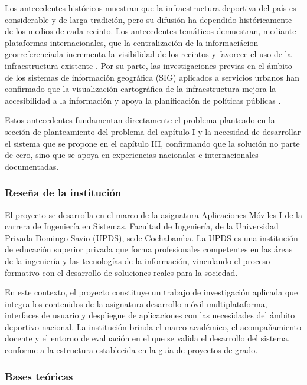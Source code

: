 Los antecedentes hist\'oricos muestran que la infraestructura deportiva del
pa\'is es considerable y de larga tradici\'on, pero su difusi\'on ha dependido
hist\'oricamente de los medios de cada recinto. Los antecedentes tem\'aticos
demuestran, mediante plataformas internacionales, que la centralizaci\'on de la
informaci\'acion georreferenciada incrementa la visibilidad de los recintos y
favorece el uso de la infraestructura existente \citep{longley2015,
pressman2010}. Por su parte, las investigaciones previas en el \'ambito de los
sistemas de informaci\'on geogr\'afica (SIG) aplicados a servicios urbanos han
confirmado que la visualizaci\'on cartogr\'afica de la infraestructura mejora la
accesibilidad a la informaci\'on y apoya la planificaci\'on de pol\'iticas
p\'ublicas \citep{longley2015}.

Estos antecedentes fundamentan directamente el problema planteado en la
secci\'on de planteamiento del problema del cap\'itulo I y la necesidad de
desarrollar el sistema que se propone en el cap\'itulo III, confirmando que la
soluci\'on no parte de cero, sino que se apoya en experiencias nacionales e
internacionales documentadas.

\subsubsection{Rese\~na de la instituci\'on}

El proyecto se desarrolla en el marco de la asignatura Aplicaciones M\'oviles
I de la carrera de Ingenier\'ia en Sistemas, Facultad de Ingenier\'ia, de la
Universidad Privada Domingo Savio (UPDS), sede Cochabamba. La UPDS es una
instituci\'on de educaci\'on superior privada que forma profesionales
competentes en las \'areas de la ingenier\'ia y las tecnolog\'ias de la
informaci\'on, vinculando el proceso formativo con el desarrollo de soluciones
reales para la sociedad.

En este contexto, el proyecto constituye un trabajo de investigaci\'on
aplicada que integra los contenidos de la asignatura \textemdash{} desarrollo
m\'ovil multiplataforma, interfaces de usuario y despliegue de
aplicaciones\textemdash{} con las necesidades del \'ambito deportivo nacional.
La instituci\'on brinda el marco acad\'emico, el acompa\~namiento docente y el
entorno de evaluaci\'on en el que se valida el desarrollo del sistema,
conforme a la estructura establecida en la gu\'ia de proyectos de grado.

\subsubsection{Bases te\'oricas}

